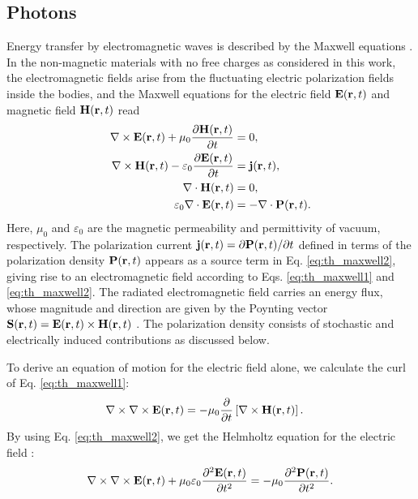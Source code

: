 \subsection{Photons}
\label{sec:th_eom2_photon}
Energy transfer by electromagnetic waves is described by the Maxwell equations \cite{jackson}. In the non-magnetic materials with no free charges as considered in this work, the electromagnetic fields arise from the fluctuating electric polarization fields inside the bodies, and the Maxwell equations for the electric field $\mathbf{E}(\mathbf{r},t)$ and magnetic field $\mathbf{H}(\mathbf{r},t)$ read \cite{novotny}
\begin{subequations}
\begin{align}
  \nabla \times \mathbf{E}(\mathbf{r},t) + \mu_0 \frac{\partial \mathbf{H}(\mathbf{r},t)}{\partial t} &= 0 , \label{eq:th_maxwell1} \\
  \nabla \times \mathbf{H}(\mathbf{r},t) - \varepsilon_0 \frac{\partial \mathbf{E}(\mathbf{r},t)}{\partial t} &=  \mathbf{j}(\mathbf{r},t) , \label{eq:th_maxwell2} \\
   \nabla \cdot \mathbf{H}(\mathbf{r},t) &= 0, \\
   \varepsilon_0 \nabla \cdot  \mathbf{E}(\mathbf{r},t) &= -\nabla \cdot \mathbf{P}(\mathbf{r},t).
\end{align}
\end{subequations}
Here, $\mu_0$ and $\varepsilon_0$ are the magnetic permeability and permittivity of vacuum, respectively. The polarization current $\mathbf{j}(\mathbf{r},t)=\partial \mathbf{P}(\mathbf{r},t)/\partial t$ defined in terms of the polarization density $\mathbf{P}(\mathbf{r},t)$ appears as a source term in Eq. \eqref{eq:th_maxwell2}, giving rise to an electromagnetic field according to Eqs. \eqref{eq:th_maxwell1} and \eqref{eq:th_maxwell2}. The radiated electromagnetic field carries an energy flux, whose magnitude and direction are given by the Poynting vector $\mathbf{S}(\mathbf{r},t)=\mathbf{E}(\mathbf{r},t)\times \mathbf{H}(\mathbf{r},t)$ \cite{novotny}. The polarization density consists of stochastic and electrically induced contributions \cite{benabdallah11} as discussed below. 

To derive an equation of motion for the electric field alone, we calculate the curl of Eq. \eqref{eq:th_maxwell1}:
\begin{alignat}{2}
  \nabla \times \nabla \times \mathbf{E}(\mathbf{r},t) &= - \mu_0 \frac{\partial}{\partial t} \left[\nabla \times \mathbf{H}(\mathbf{r},t) \right] .
\end{alignat}
By using Eq. \eqref{eq:th_maxwell2}, we get the Helmholtz equation for the electric field \cite{novotny}:
\begin{equation}
   \nabla \times \nabla \times \bE(\br,t) + \mu_0 \varepsilon_0 \frac{\partial ^2\bb{E}(\br,t)}{\partial t^2}=  - \mu_0 \frac{\partial^2 \bb{P}(\br,t)}{\partial t^2}. \label{eq:th_eom_photons} %
\end{equation}

